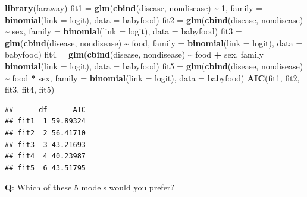 \documentclass[
  ignorenonframetext,
]{beamer}
\newenvironment{Shaded}{\begin{snugshade}}{\end{snugshade}}
\newcommand{\AttributeTok}[1]{\textcolor[rgb]{0.13,0.29,0.53}{#1}}
\newcommand{\DecValTok}[1]{\textcolor[rgb]{0.00,0.00,0.81}{#1}}
\newcommand{\FunctionTok}[1]{\textcolor[rgb]{0.13,0.29,0.53}{\textbf{#1}}}
\newcommand{\NormalTok}[1]{#1}
\newcommand{\OtherTok}[1]{\textcolor[rgb]{0.56,0.35,0.01}{#1}}
\newcommand{\SpecialCharTok}[1]{\textcolor[rgb]{0.81,0.36,0.00}{\textbf{#1}}}
\begin{document}
\begin{frame}[fragile]
\footnotesize

\begin{Shaded}
\begin{Highlighting}[]
\FunctionTok{library}\NormalTok{(faraway)}
\NormalTok{fit1 }\OtherTok{=} \FunctionTok{glm}\NormalTok{(}\FunctionTok{cbind}\NormalTok{(disease, nondisease) }\SpecialCharTok{\textasciitilde{}} \DecValTok{1}\NormalTok{, }\AttributeTok{family =} \FunctionTok{binomial}\NormalTok{(}\AttributeTok{link =}\NormalTok{ logit), }\AttributeTok{data =}\NormalTok{ babyfood)}
\NormalTok{fit2 }\OtherTok{=} \FunctionTok{glm}\NormalTok{(}\FunctionTok{cbind}\NormalTok{(disease, nondisease) }\SpecialCharTok{\textasciitilde{}}\NormalTok{ sex, }\AttributeTok{family =} \FunctionTok{binomial}\NormalTok{(}\AttributeTok{link =}\NormalTok{ logit), }\AttributeTok{data =}\NormalTok{ babyfood)}
\NormalTok{fit3 }\OtherTok{=} \FunctionTok{glm}\NormalTok{(}\FunctionTok{cbind}\NormalTok{(disease, nondisease) }\SpecialCharTok{\textasciitilde{}}\NormalTok{ food, }\AttributeTok{family =} \FunctionTok{binomial}\NormalTok{(}\AttributeTok{link =}\NormalTok{ logit), }\AttributeTok{data =}\NormalTok{ babyfood)}
\NormalTok{fit4 }\OtherTok{=} \FunctionTok{glm}\NormalTok{(}\FunctionTok{cbind}\NormalTok{(disease, nondisease) }\SpecialCharTok{\textasciitilde{}}\NormalTok{ food }\SpecialCharTok{+}\NormalTok{ sex, }\AttributeTok{family =} \FunctionTok{binomial}\NormalTok{(}\AttributeTok{link =}\NormalTok{ logit),}
    \AttributeTok{data =}\NormalTok{ babyfood)}
\NormalTok{fit5 }\OtherTok{=} \FunctionTok{glm}\NormalTok{(}\FunctionTok{cbind}\NormalTok{(disease, nondisease) }\SpecialCharTok{\textasciitilde{}}\NormalTok{ food }\SpecialCharTok{*}\NormalTok{ sex, }\AttributeTok{family =} \FunctionTok{binomial}\NormalTok{(}\AttributeTok{link =}\NormalTok{ logit),}
    \AttributeTok{data =}\NormalTok{ babyfood)}
\FunctionTok{AIC}\NormalTok{(fit1, fit2, fit3, fit4, fit5)}
\end{Highlighting}
\end{Shaded}

\begin{verbatim}
##      df      AIC
## fit1  1 59.89324
## fit2  2 56.41710
## fit3  3 43.21693
## fit4  4 40.23987
## fit5  6 43.51795
\end{verbatim}

\normalsize

\textbf{Q}: Which of these 5 models would you prefer?
\end{frame}
\end{document}
